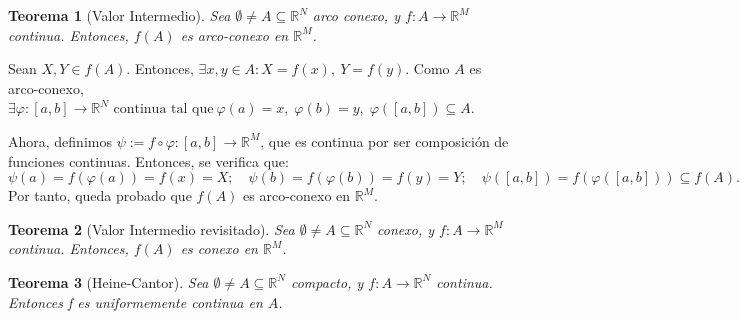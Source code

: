 \documentclass[11pt, a4paper, titlepage]{article}
\makeatletter
\renewenvironment{proof}[1][\proofname] {\vspace{-15pt}\par\pushQED{\qed}\normalfont\topsep6\p@\@plus6\p@\relax\trivlist\item[\hskip\labelsep\it#1\@addpunct{.}]\ignorespaces}{\popQED\endtrivlist\@endpefalse}
\theoremstyle{theorem-style}
\newtheorem*{nth}{Teorema}
\theoremstyle{definition-style}
\theoremstyle{remark-style}
\theoremstyle{example-style}
\makeatother
\begin{document}
\begin{nth}[Valor Intermedio]
Sea $\emptyset \ne A \subseteq \mathbb{R}^N$ arco conexo, y $f: A \longrightarrow \mathbb{R}^M$ continua. Entonces, $f(A)$ es arco-conexo en $\mathbb{R}^M$.
\end{nth}

\begin{proof}
Sean $X,Y\in f(A)$. Entonces, $\exists x,y \in A : X=f(x), \ Y=f(y)$. Como $A$ es arco-conexo, $\exists\varphi : [a,b]\longrightarrow \mathbb{R}^N \text{ continua tal que}\ \varphi(a) = x,\; \varphi(b)=y,\; \varphi([a,b]) \subseteq A$.


Ahora, definimos $\psi := f\circ \varphi : [a,b] \longrightarrow \mathbb{R}^M$, que es continua por ser composición de funciones continuas. Entonces, se verifica que: $$\psi(a) = f(\varphi(a)) = f(x) = X;\quad \psi(b)= f(\varphi(b)) = f(y) = Y;\quad \psi([a,b]) = f(\varphi([a,b])) \subseteq f(A).$$
Por tanto, queda probado que $f(A)$ es arco-conexo en $\mathbb{R}^M$.
\end{proof}



\begin{nth}[Valor Intermedio revisitado]
Sea $\emptyset \ne A\subseteq \mathbb{R}^N$ conexo, y $f:A \longrightarrow \mathbb{R}^M$ continua. Entonces, $f(A)$ es conexo en $\mathbb{R}^M$.
\end{nth}

\begin{nth}[Heine-Cantor]
	Sea $\emptyset\ne A \subseteq \mathbb{R}^N$ compacto, y $f : A \longrightarrow \mathbb{R}^N$ continua. Entonces f es uniformemente continua en $A$.
\end{nth}
\end{document}
